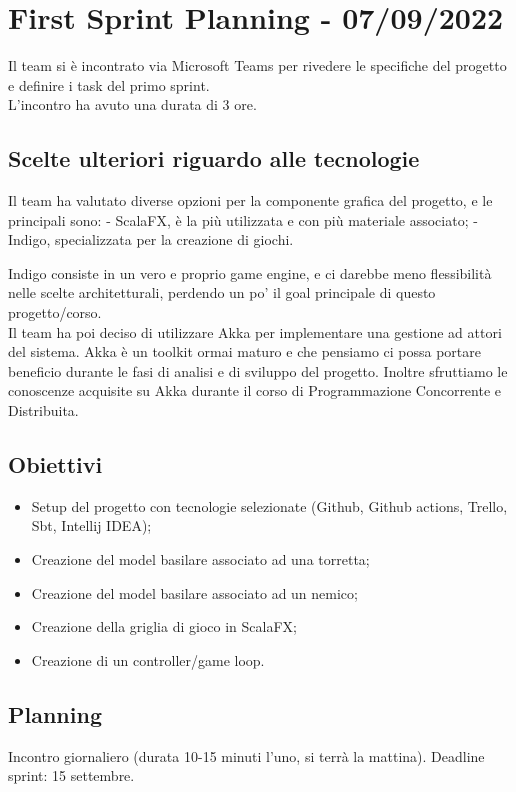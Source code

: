 \section{First Sprint Planning - 07/09/2022}
Il team si è incontrato via Microsoft Teams per rivedere le specifiche del progetto e definire i task del primo sprint.\\
L'incontro ha avuto una durata di 3 ore.

\subsection{Scelte ulteriori riguardo alle tecnologie}
Il team ha valutato diverse opzioni per la componente grafica del progetto, e le principali sono:
- ScalaFX, è la più utilizzata e con più materiale associato;
- Indigo, specializzata per la creazione di giochi.

Indigo consiste in un vero e proprio game engine, e ci darebbe meno flessibilità nelle scelte architetturali, perdendo un po' il goal principale di questo progetto/corso.\\

Il team ha poi deciso di utilizzare Akka per implementare una gestione ad attori del sistema. Akka è un toolkit ormai maturo e che pensiamo ci possa portare beneficio
durante le fasi di analisi e di sviluppo del progetto. Inoltre sfruttiamo le conoscenze acquisite su Akka durante il corso di Programmazione Concorrente e Distribuita.

\subsection{Obiettivi}
\begin{itemize}
  \item Setup del progetto con tecnologie selezionate (Github, Github actions, Trello, Sbt, Intellij IDEA);
  \item Creazione del model basilare associato ad una torretta;
  \item Creazione del model basilare associato ad un nemico;
  \item Creazione della griglia di gioco in ScalaFX;
  \item Creazione di un controller/game loop.
\end{itemize}

\subsection{Planning}
Incontro giornaliero (durata 10-15 minuti l'uno, si terrà la mattina).
Deadline sprint: 15 settembre.

